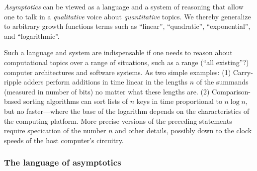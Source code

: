 {\em Asymptotics} can be viewed as a language and a system of
reasoning that allow one to talk in a {\em qualitative} voice about
{\em quantitative} topics.  We thereby generalize to arbitrary growth
functions terms such as ``linear'', ``quadratic'', ``exponential'',
and ``logarithmic''.

Such a language and system are indispensable if one needs to reason
about computational topics over a range of situations, such as a range
(``all existing''?)  computer architectures and software systems.  As
two simple examples: (1) Carry-ripple adders perform additions in time
linear in the lengths $n$ of the summands (measured in number of bits)
no matter what these lengths are. (2) Comparison-based sorting
algorithms can sort lists of $n$ keys in time proportional to $n \log
n$, but no faster---where the base of the logarithm depends on the
characteristics of the computing platform.  More precise versions of
the preceding statements require specication of the number $n$ and
other details, possibly down to the clock speeds of the host
computer's circuitry.

\subsubsection{The language of asymptotics}

